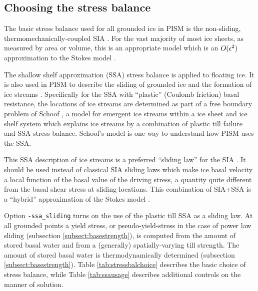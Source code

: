 \subsection{Choosing the stress balance}  \label{subsect:ssacontrol}

The basic stress balance used for all grounded ice in PISM is the non-sliding, thermomechanically-coupled SIA \cite{BBL}.  For the vast majority of most ice sheets, as measured by area or volume, this is an appropriate model which is an $O(\epsilon^2)$ approximation to the Stokes model \cite{Fowler}.

The shallow shelf approximation (SSA) stress balance is applied to floating ice.  It is also used in PISM to describe the sliding of grounded ice and the formation of ice streams \cite{BBssasliding}.  Specifically for the SSA with ``plastic'' (Coulomb friction) basal resistance, the locations of ice streams are determined as part of a free boundary problem of Schoof \cite{SchoofStream}, a model for emergent ice streams within a ice sheet and ice shelf system which explains ice streams by a combination of plastic till failure and SSA stress balance.  Schoof's model is one way to understand how PISM uses the SSA.

This SSA description of ice streams is a preferred ``sliding law'' for the SIA \cite{BBssasliding}.  It should be used instead of classical SIA sliding laws which make ice basal velocity a local function of the basal value of the driving stress, a quantity quite different from the basal shear stress at sliding locations.  This combination of SIA+SSA is a ``hybrid'' approximation of the Stokes model \cite{BBssasliding,Winkelmannetal2011}.

Option \texttt{-ssa_sliding} turns on the use of the plastic till SSA as a sliding law.  At all grounded points a yield stress, or pseudo-yield-stress  in the case of power law sliding (subsection \ref{subsect:basestrength}), is computed from the amount of stored basal water and from a (generally) spatially-varying till strength.  The amount of stored basal water is thermodynamically determined (subsection \ref{subsect:basestrength}).  Table \ref{tab:stressbalchoice} describes the basic choice of stress balance, while Table \ref{tab:ssausage} describes additional controls on the manner of solution.

